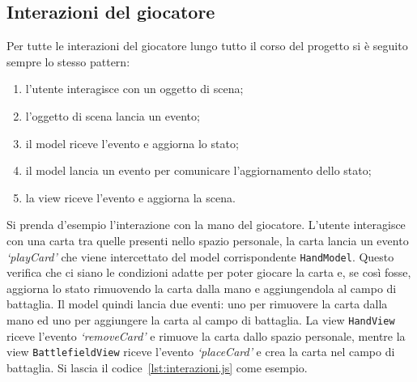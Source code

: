 \subsection{Interazioni del giocatore}
Per tutte le interazioni del giocatore lungo tutto il corso del progetto si è seguito sempre lo stesso pattern:
\begin{enumerate}
    \item l'utente interagisce con un oggetto di scena;
    \item l'oggetto di scena lancia un evento;
    \item il model riceve l'evento e aggiorna lo stato;
    \item il model lancia un evento per comunicare l'aggiornamento dello stato;
    \item la view riceve l'evento e aggiorna la scena.
\end{enumerate}
Si prenda d'esempio l'interazione con la mano del giocatore. L'utente interagisce con una carta tra quelle presenti nello spazio personale, la carta lancia un evento \textit{`playCard'}
che viene intercettato del model corrispondente \texttt{HandModel}. Questo verifica che ci siano le condizioni adatte per poter giocare la carta e, se così fosse, aggiorna lo stato
rimuovendo la carta dalla mano e aggiungendola al campo di battaglia. Il model quindi lancia due eventi: uno per rimuovere la carta dalla mano ed uno per aggiungere la carta al
campo di battaglia. La view \texttt{HandView} riceve l'evento \textit{`removeCard'} e rimuove la carta dallo spazio personale, mentre la view \texttt{BattlefieldView} riceve l'evento
\textit{`placeCard'} e crea la carta nel campo di battaglia. Si lascia il codice~\ref{lst:interazioni.js} come esempio.

